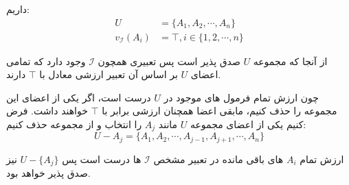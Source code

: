 \documentclass[]{exam}
\begin{document}
    داریم:
    \begin{align*}
        U &= \{A_1, A_2, \cdots, A_n\}\\
        v_\mathscr{I} (A_i) &= \top,  i \in \{1, 2, \cdots, n\}
    \end{align*}

    از آنجا که مجموعه
    $U$
    صدق پذیر است پس تعبیری همچون
    $\mathscr{I}$
    وجود دارد که تمامی اعضای
    $U$
    بر اساس آن تعبیر ارزشی معادل با 
    $\top$
    دارند. 

    چون ارزش تمام فرمول های موجود در
    $U$
    درست است، اگر یکی از اعضای این مجموعه را حذف کنیم، مابقی اعضا همچنان ارزشی برابر با
    $\top$
    خواهند داشت. 
    فرض کنیم یکی از اعضای مجموعه
    $U$
    مانند
    $A_j$
    را انتخاب و از مجموعه حذف کنیم:
    $$U - {A_j} = \{A_1, A_2, \cdots, A_{j-1}, A_{j+1}, \cdots, A_n\}$$

    ارزش تمام
    $A_i$
    های باقی مانده در تعبیر مشخص
    $\mathscr{I}$
    ها درست است پس 
    $U - \{A_j\}$
    نیز صدق پذیر خواهد بود.
\end{document}
